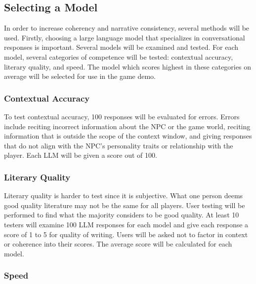 \documentclass[10pt,twocolumn]{article}
\begin{document}
    \subsection{Selecting a Model}
    
        \par 
        In order to increase coherency and narrative consistency, several methods will be used. Firstly, choosing a large language model that specializes in conversational responses is important. Several models will be examined and tested. For each model, several categories of competence will be tested: contextual accuracy, literary quality, and speed. The model which scores highest in these categories on average will be selected for use in the game demo. 

        \subsubsection{Contextual Accuracy}
        
            \par
            To test contextual accuracy, 100 responses will be evaluated for errors. Errors include reciting incorrect information about the NPC or the game world, reciting information that is outside the scope of the context window, and giving responses that do not align with the NPC's personality traits or relationship with the player. Each LLM will be given a score out of 100. 

        \subsubsection{Literary Quality}
        
            \par
            Literary quality is harder to test since it is subjective. What one person deems good quality literature may not be the same for all players. User testing will be performed to find what the majority considers to be good quality. At least 10 testers will examine 100 LLM responses for each model and give each response a score of 1 to 5 for quality of writing. Users will be asked not to factor in context or coherence into their scores. The average score will be calculated for each model.

        \subsubsection{Speed}
        
\end{document}
